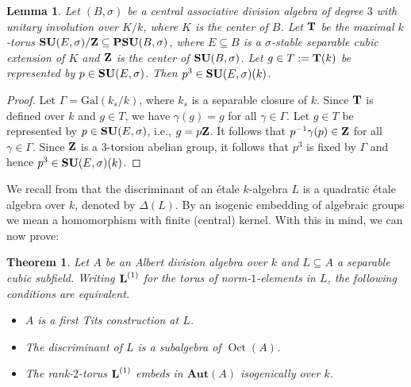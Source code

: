 \documentclass{amsart}
\newtheorem{thm}[equation]{Theorem}
\newtheorem{lem}[equation]{Lemma}
\theoremstyle{definition} %
\theoremstyle{remark} %
\DeclareMathOperator{\Oct}{Oct}
\newcommand{\bfAut}{\mathbf{Aut}}
\renewcommand{\:}{\colon\,}
\numberwithin{equation}{section}
\begin{document}
\begin{lem}\label{rational} Let $(B,\sigma)$ be a central associative division algebra of degree $3$ with unitary involution over $K/k$, where $K$ is the center of $B$. Let $\text{\bf T}$ be the maximal $k$-torus $\text{\bf SU}(E,\sigma)/\text{\bf Z}\subseteq \text{\bf PSU}(B,\sigma)$, where $E\subseteq B$ is a $\sigma$-stable separable cubic extension of $K$ and ${\bf Z}$ is the center of $\text{\bf SU}(B,\sigma)$. Let $g\in T:=\text{\bf T}(k)$ be represented by $p\in{\bf SU}(E,\sigma)$. Then $p^3\in \text{\bf SU}(E,\sigma)(k)$. 
\end{lem}
\begin{proof} Let $\Gamma = \text{Gal}(k_s/k)$, where $k_s$ is a separable closure of $k$. Since $\text{\bf T}$ is defined over $k$ and $g\in T$, we have $\gamma(g)=g$ for all $\gamma\in\Gamma$. Let $g\in T$ be represented by $p\in\text{\bf  SU}(E,\sigma)$, i.e., $g=p\text{\bf Z}$. 
 It follows that $p^{-1}\gamma(p)\in\text{\bf Z}$ for all $\gamma\in\Gamma$. 
 Since $\text{\bf Z}$ is a $3$-torsion abelian group, it follows that $p^3$ is fixed by $\Gamma$ and hence $p^3\in\text{\bf SU}(E,\sigma)(k)$.  
\end{proof}
We recall from \cite[p.~291 and Prop.~(18.24)]{MR1632779} that the discriminant of an \'etale $k$-algebra $L$ is a quadratic \'etale algebra over $k$, denoted by $\Delta(L)$.  By an isogenic embedding of algebraic groups we mean a homomorphism with finite (central) kernel. With this in mind, we can now prove:

\begin{thm}\label{normic} Let $A$ be an Albert division algebra over $k$ and $L \subseteq A$ a separable cubic subfield. Writing $\text{\bf L}^{(1)}$ for the torus of norm-$1$-elements in $L$, the following conditions are equivalent.
\begin{itemize}
\item [(i)]$A$ is a first Tits construction at $L$.

\item [(ii)] The discriminant of $L$ is a subalgebra of $\Oct(A)$.


\item [(iii)] The rank-$2$-torus $\text{\bf L}^{(1)}$ embeds in $\bfAut(A)$ isogenically over $k$.
\end{itemize}
\end{thm}
\end{document}
